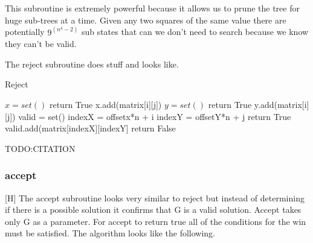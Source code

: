 \documentclass{sig-alternate}
\begin{document}
This subroutine is extremely powerful because it allows us to prune the tree for huge sub-trees at a time. Given any two squares of the same value there are potentially $9^(n^4 - 2)$ sub states that can we don't need to search because we know they can't be valid. 

The reject subroutine does stuff and looks like.

\begin{algorithm}
\caption{Reject}\label{reject}
\begin{algorithmic}[1]
\State $x = set()$
\State return True
\EndIf
\State x.add(matrix[i][j])
\EndIf
\EndFor
\EndFor
{}
\State $y = set()$
\State return True
\EndIf
\State y.add(matrix[i][j])
\EndIf
\EndFor
\EndFor
{}
\State valid = set()
\State indexX = offsetx*n + i
\State indexY = offsetY*n + j
\State return True
\EndIf
\State valid.add(matrix[indexX][indexY]
\EndIf
\EndFor
\EndFor
\EndFor
\EndFor
\State return False
\EndProcedure
\end{algorithmic}
\end{algorithm}

TODO:CITATION

\subsubsection{accept}[H]
The accept subroutine looks very similar to reject but instead of determining if there is a possible solution it confirms that G is a valid solution. Accept takes only G as a parameter. For accept to return true all of the conditions for the win must be satisfied. The algorithm looks like the following.
\end{document}
